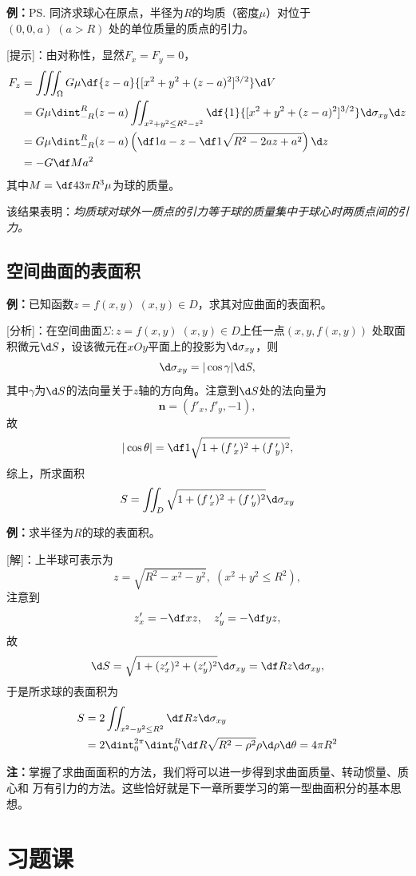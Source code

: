 {\bf 例：}\ps{同济}求球心在原点，半径为$R$的均质（密度$\mu$）对位于$(0,0,a)\;(a>R)$
处的单位质量的质点的引力。

[提示]：由对称性，显然$F_x=F_y=0$，
\begin{align*}
	F_z&=\iiint_{\Omega}G\mu\df{z-a}{[x^2+y^2+(z-a)^2]^{3/2}}\d V\\
	&=G\mu\dint_{-R}^R(z-a)\iint_{x^2+y^2\leq R^2-z^2}
	\df{1}{[x^2+y^2+(z-a)^2]^{3/2}}
	\d\sigma_{xy}\d z\\
	&=G\mu\dint_{-R}^R(z-a)
	\left(\df1{a-z}-\df1{\sqrt{R^2-2az+a^2}}\right)\d z\\
	&=-G\df M{a^2}
\end{align*}
其中$M=\df43\pi R^3\mu$为球的质量。

该结果表明：{\it 均质球对球外一质点的引力等于球的质量集中于球心时两质点间的引力。}

\subsection{空间曲面的表面积}

{\bf 例：}已知函数$z=f(x,y)\;(x,y)\in D$，求其对应曲面的表面积。

[分析]：在空间曲面$\Sigma:z=f(x,y)\;(x,y)\in D$上任一点$(x,y,f(x,y))$
处取面积微元$\d S$，设该微元在$xOy$平面上的投影为$\d\sigma_{xy}$，则
$$\d\sigma_{xy}=|\cos\gamma|\d S,$$
其中$\gamma$为$\d S$的法向量关于$z$轴的方向角。注意到$\d S$处的法向量为
$$\bm{n}=(f'_x,f'_y,-1),$$
故
$$|\cos\theta|=\df1{\sqrt{1+(f\,'_x)^2+(f\,'_y)^2}},$$
综上，所求面积
$${S=\iint_D\sqrt{1+(f\,'_x)^2+(f\,'_y)^2}\d\sigma_{xy}}$$

{\bf 例：}求半径为$R$的球的表面积。

[解]：上半球可表示为
$$z=\sqrt{R^2-x^2-y^2},\;(x^2+y^2\leq R^2),$$
注意到
$$z'_x=-\df xz,\quad z'_y=-\df yz,$$
故
$$\d S=\sqrt{1+(z'_x)^2+(z'_y)^2}\d\sigma_{xy}=\df Rz\d\sigma_{xy},$$
于是所求球的表面积为
\begin{align*}
	S&=2\iint_{x^2-y^2\leq R^2}\df Rz\d\sigma_{xy}\\
	&=2\dint_0^{2\pi}\dint_0^R\df R{\sqrt{R^2-\rho^2}}\rho\d\rho\d\theta
	=4\pi R^2
\end{align*}

{\bf 注：}掌握了求曲面面积的方法，我们将可以进一步得到求曲面质量、转动惯量、质心和
万有引力的方法。这些恰好就是下一章所要学习的第一型曲面积分的基本思想。

\section{习题课}

